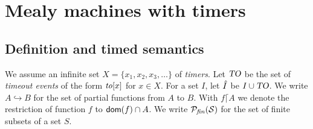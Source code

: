 \section{Mealy machines with timers}

\subsection{Definition and timed semantics}
We assume an infinite set $X = \{ x_1, x_2, x_3,\ldots \}$ of {\em timers}.
Let $\mbox{\sl TO}$ be the set of {\em timeout events} of the form
$\mathit{to}[x]$ for $x \in X$.
For a set $I$, let $\hat{I}$ be $I \cup \mbox{\sl TO}$.
%
We write $A \hookrightarrow B$ for the set of partial functions from $A$ to $B$.
With $f \lceil A$ we denote the restriction of function $f$ to ${\textsf{dom}}(f) \cap A$.
We write $\cal{P}_{\mathit{fin}}(S)$ for the set of finite subsets of a set $S$.

